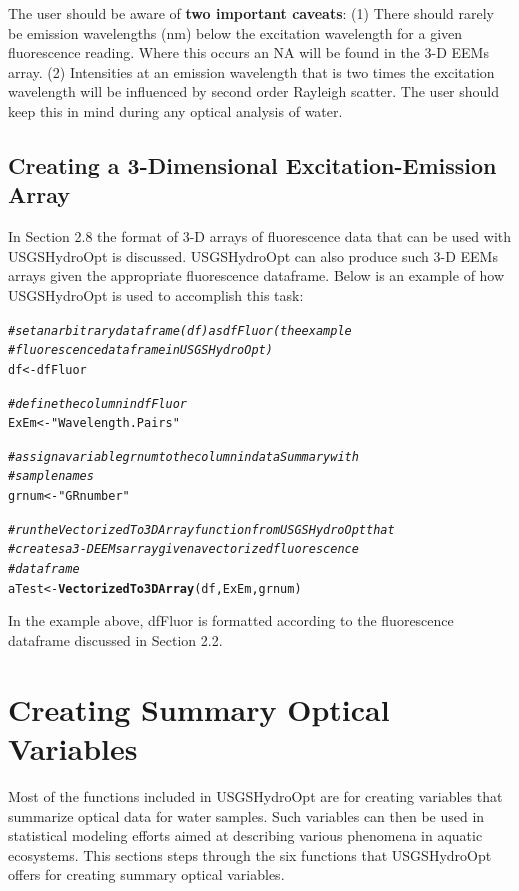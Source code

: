 \documentclass[a4paper,11pt]{article}\usepackage[]{graphicx}\usepackage[]{color}
\makeatletter
\newcommand{\hlstr}[1]{\textcolor[rgb]{0.192,0.494,0.8}{#1}}%
\newcommand{\hlcom}[1]{\textcolor[rgb]{0.678,0.584,0.686}{\textit{#1}}}%
\newcommand{\hlstd}[1]{\textcolor[rgb]{0.345,0.345,0.345}{#1}}%
\newcommand{\hlkwb}[1]{\textcolor[rgb]{0.69,0.353,0.396}{#1}}%
\newcommand{\hlkwd}[1]{\textcolor[rgb]{0.737,0.353,0.396}{\textbf{#1}}}%
\newenvironment{kframe}{%
 \def\at@end@of@kframe{}%
 \ifinner\ifhmode%
  \def\at@end@of@kframe{\end{minipage}}%
  \begin{minipage}{\columnwidth}%
 \fi\fi%
 \def\FrameCommand##1{\hskip\@totalleftmargin \hskip-\fboxsep
 \colorbox{shadecolor}{##1}\hskip-\fboxsep
     \hskip-\linewidth \hskip-\@totalleftmargin \hskip\columnwidth}%
 \MakeFramed {\advance\hsize-\width
   \@totalleftmargin\z@ \linewidth\hsize
   \@setminipage}}%
 {\par\unskip\endMakeFramed%
 \at@end@of@kframe}
\newenvironment{knitrout}{}{} %
\makeatother
\begin{document}
The user should be aware of \textbf{two important caveats}: (1) There should rarely be emission wavelengths (nm) below the excitation wavelength for a given fluorescence reading. Where this occurs an NA will be found in the 3-D EEMs array. (2) Intensities at an emission wavelength that is two times the excitation wavelength will be influenced by second order Rayleigh scatter. The user should keep this in mind during any optical analysis of water.

\subsection{Creating a 3-Dimensional Excitation-Emission Array}
In Section 2.8 the format of 3-D arrays of fluorescence data that can be used with USGSHydroOpt is discussed. USGSHydroOpt can also  produce such 3-D EEMs arrays given the appropriate fluorescence dataframe. Below is an example of how USGSHydroOpt is used to accomplish this task: 

\begin{knitrout}
\color{fgcolor}\begin{kframe}
\begin{alltt}
\hlcom{# set an arbitrary data frame (df) as dfFluor (the example}
\hlcom{# fluorescence dataframe in USGSHydroOpt)}
\hlstd{df} \hlkwb{<-} \hlstd{dfFluor}

\hlcom{# define the column in dfFluor}
\hlstd{ExEm} \hlkwb{<-} \hlstr{"Wavelength.Pairs"}

\hlcom{# assign a variable grnum to the column in dataSummary with}
\hlcom{# sample names}
\hlstd{grnum} \hlkwb{<-} \hlstr{"GRnumber"}

\hlcom{# run the VectorizedTo3DArray function from USGSHydroOpt that}
\hlcom{# creates a 3-D EEMs array given a vectorized fluorescence}
\hlcom{# dataframe}
\hlstd{aTest} \hlkwb{<-} \hlkwd{VectorizedTo3DArray}\hlstd{(df, ExEm, grnum)}
\end{alltt}
\end{kframe}
\end{knitrout}

In the example above, dfFluor is formatted according to the fluorescence dataframe discussed in Section 2.2. 

\section{Creating Summary Optical Variables}
Most of the functions included in USGSHydroOpt are for creating variables that summarize optical data for water samples. Such variables can then be used in statistical modeling efforts aimed at describing various phenomena in aquatic ecosystems. This sections steps through the six functions that USGSHydroOpt offers for creating summary optical variables.
\end{document}
